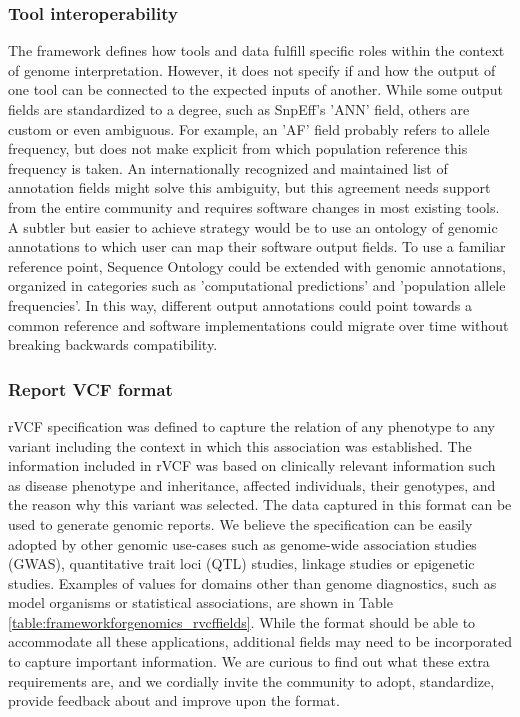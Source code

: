 \subsubsection{Tool interoperability}
The framework defines how tools and data fulfill specific roles within the context of genome interpretation.
However, it does not specify if and how the output of one tool can be connected to the expected inputs of another.
While some output fields are standardized to a degree, such as SnpEff’s 'ANN' field, others are custom or even ambiguous.
For example, an 'AF' field probably refers to allele frequency, but does not make explicit from which population reference this frequency is taken.
An internationally recognized and maintained list of annotation fields might solve this ambiguity, but this agreement needs support from the entire community and requires software changes in most existing tools.
A subtler but easier to achieve strategy would be to use an ontology of genomic annotations to which user can map their software output fields.
To use a familiar reference point, Sequence Ontology\cite{Eilbeck_2005} could be extended with genomic annotations, organized in categories such as 'computational predictions' and 'population allele frequencies'.
In this way, different output annotations could point towards a common reference and software implementations could migrate over time without breaking backwards compatibility.

\subsubsection{Report VCF format}
rVCF specification was defined to capture the relation of any phenotype to any variant including the context in which this association was established.
The information included in rVCF was based on clinically relevant information such as disease phenotype and inheritance, affected individuals, their genotypes, and the reason why this variant was selected.
The data captured in this format can be used to generate genomic reports.
We believe the specification can be easily adopted by other genomic use-cases such as genome-wide association studies (GWAS), quantitative trait loci (QTL) studies, linkage studies or epigenetic studies.
Examples of values for domains other than genome diagnostics, such as model organisms or statistical associations, are shown in Table \ref{table:frameworkforgenomics_rvcffields}.
While the format should be able to accommodate all these applications, additional fields may need to be incorporated to capture important information.
We are curious to find out what these extra requirements are, and we cordially invite the community to adopt, standardize, provide feedback about and improve upon the format.

